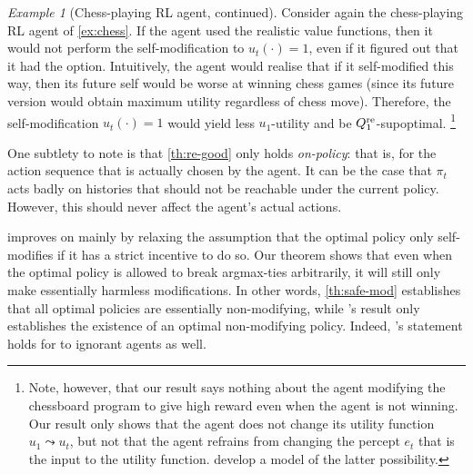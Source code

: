 \documentclass[a4paper]{article}
\theoremstyle{definition}
\theoremstyle{remark}
\newtheorem{example}[theorem]{Example}
\newcommand*{\Qre}[1][]{Q^{{\rm re} #1}}
\begin{document}
\begin{example}[Chess-playing RL agent, continued]
  Consider again the chess-playing RL agent of \cref{ex:chess}.
  If the agent used the realistic value functions, then it would
  not perform the self-modification to $u_t(\cdot)=1$,
  even if it figured out that it had the option.
  Intuitively, the agent would realise that if it self-modified this way,
  then its future self would be worse at winning chess games
  (since its future version would obtain maximum utility regardless of
  chess move).
  Therefore, the self-modification $u_t(\cdot)=1$ would yield less
  $u_1$-utility and be $\Qre_1$-supoptimal.%
  \footnote{
    Note, however, that our result says nothing about the agent modifying the
    chessboard program to give high reward even when the agent
    is not winning.
    Our result only shows that the agent does not change its utility function
    $u_1\leadsto u_t$, but not that the agent refrains from changing
    the percept $e_t$ that
    is the input to the utility function.
    \citet{Ring2011} develop a model of the latter possibility.}
\end{example}

One subtlety to note is that \cref{th:re-good}
only holds \emph{on-policy}: that is,
for the action sequence that is actually chosen by the agent.
It can be the case that $\pi_t$ acts badly on histories that
should not be reachable under the current policy.
However, this should never affect the agent's actual actions.

 improves on \citet[Prop.~4]{Hibbard2012}
mainly by relaxing the assumption that the optimal policy only
self-modifies if it has a strict incentive to do so.
Our theorem shows that even when the optimal policy is allowed
to break argmax-ties arbitrarily, it will still only make
essentially harmless modifications.
In other words, \cref{th:safe-mod} establishes that all
optimal policies are essentially non-modifying,
while \citeauthor{Hibbard2012}'s result
only establishes the existence of an optimal non-modifying policy.
Indeed, \citeauthor{Hibbard2012}'s statement holds for to ignorant agents as well.
\end{document}
